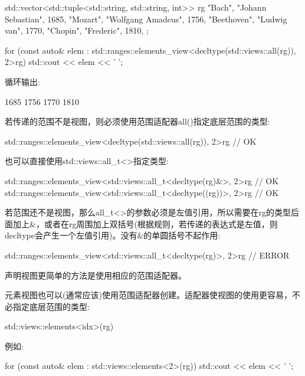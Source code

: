 \begin{cpp}
std::vector<std::tuple<std::string, std::string, int>> rg{
	{"Bach", "Johann Sebastian", 1685}, {"Mozart", "Wolfgang Amadeus", 1756},
	{"Beethoven", "Ludwig van", 1770}, {"Chopin", "Frederic", 1810},
};

for (const auto& elem
	: std::ranges::elements_view<decltype(std::views::all(rg)), 2>{rg}) {
	std::cout << elem << ' ';
}
\end{cpp}

循环输出:

\begin{shell}
1685 1756 1770 1810
\end{shell}

若传递的范围不是视图，则必须使用范围适配器all()指定底层范围的类型:

\begin{cpp}
std::ranges::elements_view<decltype(std::views::all(rg)), 2>{rg} // OK
\end{cpp}

也可以直接使用std::views::all\_t<>指定类型:

\begin{cpp}
std::ranges::elements_view<std::views::all_t<decltype(rg)&>, 2>{rg} // OK
std::ranges::elements_view<std::views::all_t<decltype((rg))>, 2>{rg} // OK
\end{cpp}

若范围还不是视图，那么all\_t<>的参数必须是左值引用，所以需要在rg的类型后面加上\&，或者在rg周围加上双括号(根据规则，若传递的表达式是左值，则decltype会产生一个左值引用)。没有\&的单圆括号不起作用:

\begin{cpp}
std::ranges::elements_view<std::views::all_t<decltype(rg)>, 2>{rg} // ERROR
\end{cpp}

声明视图更简单的方法是使用相应的范围适配器。


元素视图也可以(通常应该)使用范围适配器创建。适配器使视图的使用更容易，不必指定底层范围的类型:

\begin{cpp}
std::views::elements<idx>(rg)
\end{cpp}

例如:

\begin{cpp}
for (const auto& elem : std::views::elements<2>(rg)) {
	std::cout << elem << ' ';
}
\end{cpp}

